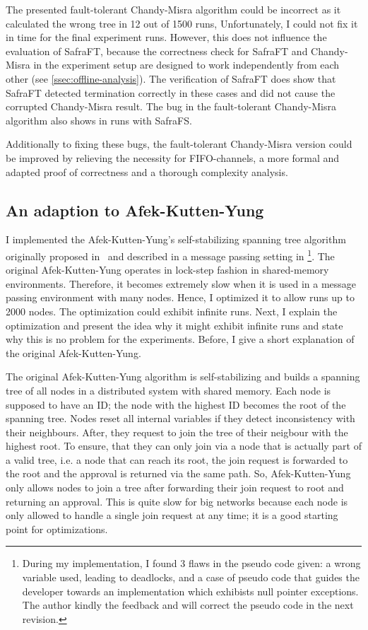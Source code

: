 The presented fault-tolerant Chandy-Misra algorithm could be incorrect as it calculated the wrong tree in 12 out of 1500 runs,
Unfortunately, I could not fix it in time for the final experiment runs.
However, this does not influence the evaluation of SafraFT, because the correctness check for SafraFT and Chandy-Misra in the experiment setup are designed to work independently from each other (see \cref{ssec:offline-analysis}).
The verification of SafraFT does show that SafraFT detected termination correctly in these cases and did not cause the corrupted Chandy-Misra result.
The bug in the fault-tolerant Chandy-Misra algorithm also shows in runs with SafraFS.

Additionally to fixing these bugs, the fault-tolerant Chandy-Misra version could be improved by relieving the necessity for FIFO-channels, a more formal and adapted proof of correctness and a thorough complexity analysis.

\subsection{An adaption to Afek-Kutten-Yung}
I implemented the Afek-Kutten-Yung's self-stabilizing spanning tree algorithm originally proposed in~\cite{afek} and  described in a message passing setting in \cite[page 183ff]{fokkink:2018}\footnote{During my implementation, I found 3 flaws in the pseudo code given: a wrong variable used, leading to deadlocks, and a case of pseudo code that guides the developer towards an implementation which exhibists null pointer exceptions. The author kindly the feedback and will correct the pseudo code in the next revision.}.
The original Afek-Kutten-Yung operates in lock-step fashion in shared-memory environments.
Therefore, it becomes extremely slow when it is used in a message passing environment with many nodes.
Hence, I optimized it to allow runs up to 2000 nodes.
The optimization could exhibit infinite runs.
Next, I explain the optimization and present the idea why it might exhibit infinite runs and state why this is no problem for the experiments. Before, I give a short explanation of the original Afek-Kutten-Yung.

The original Afek-Kutten-Yung algorithm is self-stabilizing and builds a spanning tree of all nodes in a distributed system with shared memory. 
Each node is supposed to have an ID; the node with the highest ID becomes the root of the spanning tree.
Nodes reset all internal variables if they detect inconsistency with their neighbours.
After, they request to join the tree of their neigbour with the highest root.
To ensure, that they can only join via a node that is actually part of a valid tree, i.e. a node that can reach its root, the join request is forwarded to the root and the approval is returned via the same path.
So, Afek-Kutten-Yung only allows nodes to join a tree after forwarding their join request to root and returning an approval.
This is quite slow for big networks because each node is only allowed to handle a single join request at any time; 
it is a good starting point for optimizations.

